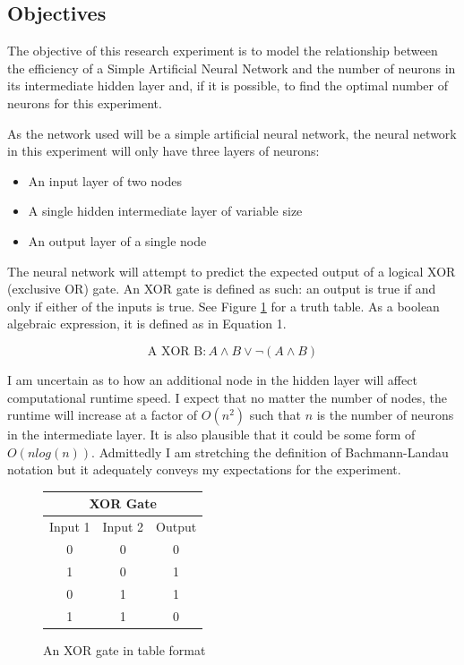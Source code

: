 \documentclass[12pt]{article}
\begin{document}
\subsection{Objectives \label{objectives}}

The objective of this research experiment is to model the relationship between the efficiency of a Simple Artificial Neural Network and the number of neurons in its intermediate hidden layer and, if it is possible, to find the optimal number of neurons for this experiment.

As the network used will be a simple artificial neural network, the neural network in this experiment will only have three layers of neurons:

\begin{itemize}
  \item An input layer of two nodes
  \item A single hidden intermediate layer of variable size
  \item An output layer of a single node
\end{itemize}

The neural network will attempt to predict the expected output of a logical XOR (exclusive OR) gate. An XOR gate is defined as such: an output is true if and only if either of the inputs is true. See Figure \ref{xortable} for a truth table. As a boolean algebraic expression, it is defined as in Equation 1.

\begin{equation}
  \textrm{A XOR B}: A \wedge B \vee \neg(A \wedge B)
\end{equation}


I am uncertain as to how an additional node in the hidden layer will affect computational runtime speed. I expect that no matter the number of nodes, the runtime will increase at a factor of $O(n^2)$ such that $n$ is the number of neurons in the intermediate layer. It is also plausible that it could be some form of $O(nlog(n))$. Admittedly I am stretching the definition of Bachmann-Landau notation but it adequately conveys my expectations for the experiment.

\begin{figure}[h]
  \begin{center}
  \begin{tabular}{|c|c|c|}
  \hline
  \multicolumn{3}{|c|}{XOR Gate} \\
  \hline
  Input 1 & Input 2 & Output \\
  \hline
  0 & 0 & 0 \\
  1 & 0 & 1 \\
  0 & 1 & 1 \\
  1 & 1 & 0 \\
  \hline
  \end{tabular}
  \end{center}
  \caption{An XOR gate in table format \label{xortable}}
\end{figure}
\end{document}

